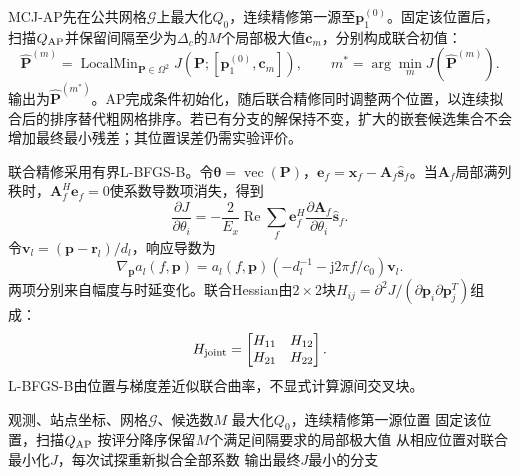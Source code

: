 \documentclass[a4paper,fleqn]{cas-sc}
\newcommand{\Rea}{\operatorname{Re}}
\begin{document}
MCJ-AP先在公共网格$\mathcal G$上最大化$Q_0$，连续精修第一源至$\bm p_1^{(0)}$。固定该位置后，扫描$Q_{\rm AP}$并保留间隔至少为$\Delta_c$的$M$个局部极大值$\bm c_m$，分别构成联合初值：
\begin{equation}
\widehat{\bm P}^{(m)}=\operatorname{LocalMin}_{\bm P\in\Omega^2}
 J(\bm P;[\bm p_1^{(0)},\bm c_m]),\qquad
m^*=\arg\min_m J(\widehat{\bm P}^{(m)}).
\label{en:branch}
\end{equation}
输出为$\widehat{\bm P}^{(m^*)}$。AP完成条件初始化，随后联合精修同时调整两个位置，以连续拟合后的排序替代粗网格排序。若已有分支的解保持不变，扩大的嵌套候选集合不会增加最终最小残差；其位置误差仍需实验评价。

联合精修采用有界L-BFGS-B\cite{Byrd1995}。令$\bm\theta=\operatorname{vec}(\bm P)$，$\bm e_f=\bm x_f-\bm A_f\widehat{\bm s}_f$。当$\bm A_f$局部满列秩时，$\bm A_f^H\bm e_f=0$使系数导数项消失，得到
\begin{equation}
\frac{\partial J}{\partial\theta_i}=-\frac{2}{E_x}\Rea\sum_f
 \bm e_f^H\frac{\partial\bm A_f}{\partial\theta_i}\widehat{\bm s}_f.
\label{en:gradient}
\end{equation}
令$\bm v_l=(\bm p-\bm r_l)/d_l$，响应导数为
\begin{equation}
\nabla_{\bm p}a_l(f,\bm p)=a_l(f,\bm p)
 (-d_l^{-1}-\mathrm j2\pi f/c_0)\bm v_l.
\end{equation}
两项分别来自幅度与时延变化。联合Hessian由$2\times2$块$H_{ij}=\partial^2J/(\partial\bm p_i\partial\bm p_j^T)$组成：
\begin{equation}
H_{\rm joint}=\begin{bmatrix}H_{11}&H_{12}\\H_{21}&H_{22}\end{bmatrix}.
\end{equation}
L-BFGS-B由位置与梯度差近似联合曲率，不显式计算源间交叉块。

\begin{algorithm}[H]
\caption{MCJ-AP}\label{en:algap}
\begin{algorithmic}[1]
\Require 观测、站点坐标、网格$\mathcal G$、候选数$M$
\State 最大化$Q_0$，连续精修第一源位置
\State 固定该位置，扫描$Q_{\rm AP}$
\State 按评分降序保留$M$个满足间隔要求的局部极大值
\State 从相应位置对联合最小化$J$，每次试探重新拟合全部系数
\EndFor
\State 输出最终$J$最小的分支
\end{algorithmic}
\end{algorithm}

\FloatBarrier
\end{document}
